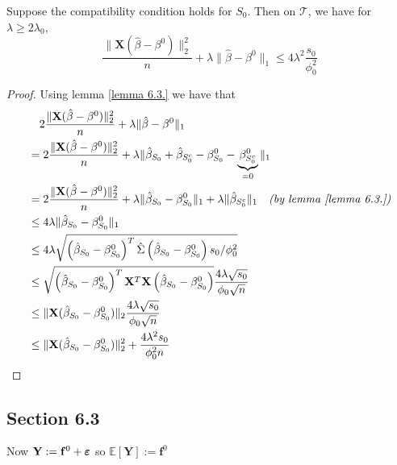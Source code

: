 \begin{theorem}[Theorem 6.1.]
    Suppose the compatibility condition holds for $S_{0}$. Then on $\mathscr{T}$, we have for $\lambda \geq 2 \lambda_{0}$,
    $$
        \frac{\|\mathbf{X}(\hat{\beta}-\beta^{0})\|_{2}^{2}}{n}+\lambda\|\hat{\beta}-\beta^{0}\|_{1} \leq 4 \lambda^{2} \frac{s_{0}}{\phi_{0}^{2}}
    $$
\end{theorem}
\begin{proof}
    Using lemma \ref{lemma 6.3.} we have that
    \begin{align*}
         & \quad 2 \frac{\|\mathbf{X}(\hat{\beta}-\beta^{0})\|_{2}^{2}}{n} + \lambda\|\hat{\beta}-\beta^{0}\|_{1}                                                                              \\
         & = 2 \frac{\|\mathbf{X}(\hat{\beta}-\beta^{0})\|_{2}^{2}}{n} + \lambda \| \hat{\beta}_{S_0} + \hat{\beta}_{S_{0}^{c}} - \beta^{0}_{S_0} - \underbrace{\beta^{0}_{S_0^c}}_{=0} \|_{1} \\
         & = 2 \frac{\|\mathbf{X}(\hat{\beta}-\beta^{0})\|_{2}^{2}}{n} + \lambda \| \hat{\beta}_{S_0} - \beta^{0}_{S_0} \|_{1} + \lambda \| \hat{\beta}_{S_{0}^{c}} \|_1 \quad \textit{(by lemma \ref{lemma 6.3.})}                       \\
         & \leq 4 \lambda \|\hat{\beta}_{S_{0}} - \beta_{S_{0}}^{0} \|_{1} \\
         & \leq 4 \lambda \sqrt{\left( \hat{\beta}_{S_{0}} - \beta_{S_{0}}^{0} \right)^{T} \hat{\Sigma} \left( \hat{\beta}_{S_{0}} - \beta_{S_{0}}^{0}  \right) s_{0} / \phi_{0}^{2}} \\
         & \leq \sqrt{\left( \hat{\beta}_{S_{0}} - \beta_{S_{0}}^{0} \right)^{T} \mathbf{X}^T \mathbf{X} \left( \hat{\beta}_{S_{0}} - \beta_{S_{0}}^{0}  \right)} \frac{4 \lambda \sqrt{s_{0}}}{\phi_{0} \sqrt{n}} \\
         & \leq \| \mathbf{X} ( \hat{\beta}_{S_{0}} - \beta_{S_{0}}^{0} ) \|_2 \frac{4 \lambda \sqrt{s_{0}}}{\phi_{0} \sqrt{n}} \\
         & \leq \| \mathbf{X} ( \hat{\beta}_{S_{0}} - \beta_{S_{0}}^{0} ) \|^2_2 + \frac{4 \lambda^2 s_{0}}{\phi^2_{0} n} \\
    \end{align*}
\end{proof}


\subsection{Section 6.3}

Now $\mathbf{Y} :=\mathbf{f}^{0} + \boldsymbol{\varepsilon}$ so $\mathbb{E} [\mathbf{Y}] :=\mathbf{f}^{0}$


